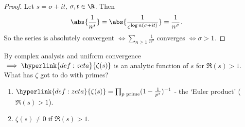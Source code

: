 \documentclass{article}
\begin{document}
\begin{proof}
    Let $s = \sigma + i t$, $\sigma,t \in \R$.  Then
    \begin{equation*}
        \abs{\frac{1}{n^s}} = \abs{\frac{1}{e^{\log n (\sigma + i t)}}} = \frac{1}{n^\sigma}.
    \end{equation*}
    So the series is absolutely convergent $\iff \sum_{n \geq 1} \frac{1}{n^\sigma}$ converges $\iff \sigma > 1$.
\end{proof}

By complex analysis and uniform convergence $\implies \hyperlink{def:zeta}{\zeta(s)}$ is an analytic function of $s$ for $\Re(s) > 1$.
What has $\zeta$ got to do with primes?

\begin{nthm}\label{thm:5.4}\leavevmode
    \begin{enumerate}[label=(\roman*)]
        \item $\hyperlink{def:zeta}{\zeta(s)} = \prod_{p \text{ prime}} (1 - \frac{1}{p^s})^{-1}$ - the `Euler product' ($\Re(s) > 1$).
        \item $\zeta(s) \neq 0$ if $\Re(s) > 1$.
    \end{enumerate}
\end{nthm}

\end{document}
